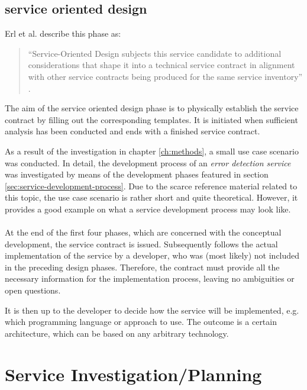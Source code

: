 \subsection{service oriented design}

Erl et al. describe this phase as:
\begin{quote}
``Service-Oriented Design subjects this service candidate to additional considerations that shape it into a technical service contract in alignment with other service contracts being produced for the same service inventory'' \cite[p.86]{erl2011}.
\end{quote}


The aim of the service oriented design phase is to physically establish the service contract by filling out the corresponding templates. It is initiated when sufficient analysis has been conducted and ends with a finished service contract.















As a result of the investigation in chapter \ref{ch:methods}, a small use case scenario was conducted. In detail, the development process of an \emph{error detection service} was investigated by means of the development phases featured in section \ref{sec:service-development-process}. Due to the scarce reference material related to this topic, the use case scenario is rather short and quite theoretical. However, it provides a good example on what a service development process may look like.
\\
\\
At the end of the first four phases, which are concerned with the conceptual development, the service contract is issued. Subsequently follows the actual implementation of the service by a developer, who was (most likely) not included in the preceding design phases. Therefore, the contract must provide all the necessary information for the implementation process, leaving no ambiguities or open questions.

It is then up to the developer to decide how the service will be implemented, e.g. which programming language or approach to use. The outcome is a certain architecture, which can be based on any arbitrary technology. 



\section{Service Investigation/Planning}


